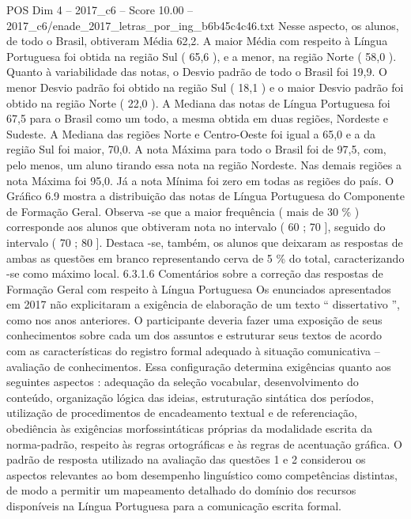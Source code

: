 \begin{textsample}{POS Dim 4 – 2017\_c6 – Score 10.00 – 2017\_c6/enade\_2017\_letras\_por\_ing\_b6b45c4c46.txt}
Nesse aspecto, os alunos, de todo o Brasil, obtiveram Média 62,2.
A maior Média com respeito à Língua Portuguesa foi obtida na região Sul ( 65,6 ), e a menor, na região Norte ( 58,0 ).
Quanto à variabilidade das notas, o Desvio padrão de todo o Brasil foi 19,9.
O menor Desvio padrão foi obtido na região Sul ( 18,1 ) e o maior Desvio padrão foi obtido na região Norte ( 22,0 ).
A Mediana das notas de Língua Portuguesa foi 67,5 para o Brasil como um todo, a mesma obtida em duas regiões, Nordeste e Sudeste.
A Mediana das regiões Norte e Centro-Oeste foi igual a 65,0 e a da região Sul foi maior, 70,0.
A nota Máxima para todo o Brasil foi de 97,5, com, pelo menos, um aluno tirando essa nota na região Nordeste.
Nas demais regiões a nota Máxima foi 95,0.
Já a nota Mínima foi zero em todas as regiões do país.
O Gráfico 6.9 mostra a distribuição das notas de Língua Portuguesa do Componente de Formação Geral.
Observa -se que a maior frequência ( mais de 30 \% ) corresponde aos alunos que obtiveram nota no intervalo ( 60 ; 70 ], seguido do intervalo ( 70 ; 80 ].
Destaca -se, também, os alunos que deixaram as respostas de ambas as questões em branco representando cerva de 5 \% do total, caracterizando -se como máximo local. 6.3.1.6 Comentários sobre a correção das respostas de Formação Geral com respeito à Língua Portuguesa Os enunciados apresentados em 2017 não explicitaram a exigência de elaboração de um texto “ dissertativo ”, como nos anos anteriores.
O participante deveria fazer uma exposição de seus conhecimentos sobre cada um dos assuntos e estruturar seus textos de acordo com as características do registro formal adequado à situação comunicativa – avaliação de conhecimentos.
Essa configuração determina exigências quanto aos seguintes aspectos : adequação da seleção vocabular, desenvolvimento do conteúdo, organização lógica das ideias, estruturação sintática dos períodos, utilização de procedimentos de encadeamento textual e de referenciação, obediência às exigências morfossintáticas próprias da modalidade escrita da norma-padrão, respeito às regras ortográficas e às regras de acentuação gráfica.
O padrão de resposta utilizado na avaliação das questões 1 e 2 considerou os aspectos relevantes ao bom desempenho linguístico como competências distintas, de modo a permitir um mapeamento detalhado do domínio dos recursos disponíveis na Língua Portuguesa para a comunicação escrita formal.

\end{textsample}
